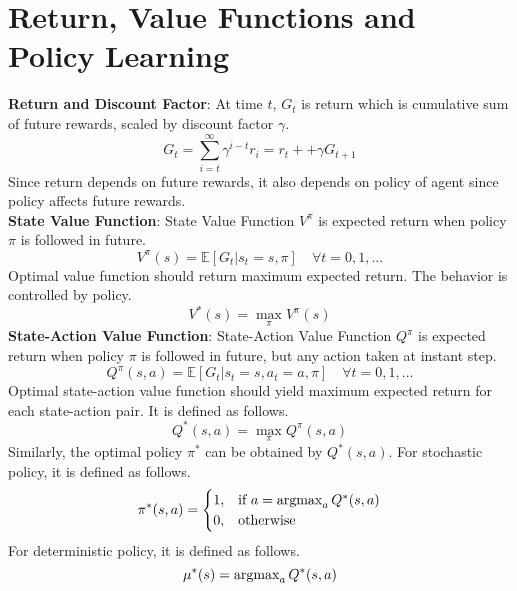 \section{Return, Value Functions and Policy Learning}
\textbf{Return and Discount Factor}: At time $t$, $G_t$ is return which is cumulative sum of future rewards, scaled by discount factor $\gamma$. \\
\begin{equation}
G_t = \sum_{i=t}^{\infty} \gamma^{i-t} r_i = r_t + + \gamma G_{t+1}
\end{equation}
Since return depends on future rewards, it also depends on policy of agent since policy affects future rewards. \\
\textbf{State Value Function}: State Value Function $V^{\pi}$ is expected return when policy $\pi$ is followed in future. \\
\begin{equation}
V^{\pi}(s) = \mathbb{E}[G_t|s_t=s, \pi] \quad \forall t = 0,1, ...
\end{equation}
Optimal value function should return maximum expected return. The behavior is controlled by policy. \\
\begin{equation}
V^{*}(s) = \max_{\pi} V^{\pi}(s)
\end{equation}
\textbf{State-Action Value Function}: State-Action Value Function $Q^{\pi}$ is expected return when policy $\pi$ is followed in future, but any action taken at instant step. \\
\begin{equation}
Q^{\pi}(s,a) = \mathbb{E}[G_t|s_t=s, a_t=a, \pi] \quad \forall t = 0,1, ...
\end{equation}
Optimal state-action value function should yield maximum expected return for each state-action pair. It is defined as follows. \\
\begin{equation}
Q^{*}(s,a) = \max_{\pi} Q^{\pi}(s,a)
\end{equation}
Similarly, the optimal policy $\pi^*$ can be obtained by $Q^{*}(s,a)$. For stochastic policy, it is defined as follows. \\
\begin{equation}
\label{eqn:policy_stochastic_q}
\pi^{*}(s,a) = 
\begin{cases}
1,   & \text{if  } a = \operatorname{\textup{argmax}}_{a} Q^{*}(s,a) \\
0,   & \text{otherwise  }
\end{cases} 
\end{equation}
For deterministic policy, it is defined as follows. \\
\begin{equation}
\label{eqn:policy_deterministic_q}
\mu^{*}(s) = \operatorname{\textup{argmax}}_{a} Q^{*}(s,a)
\end{equation}
